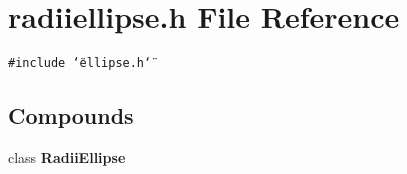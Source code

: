 \section{radiiellipse.h File Reference}
\label{radiiellipse_8h}
{\tt \#include \char`\"{}ellipse.h\char`\"{}}\par
\subsection*{Compounds}
\begin{CompactItemize}
\item 
class {\bf Radii\-Ellipse}
\end{CompactItemize}
